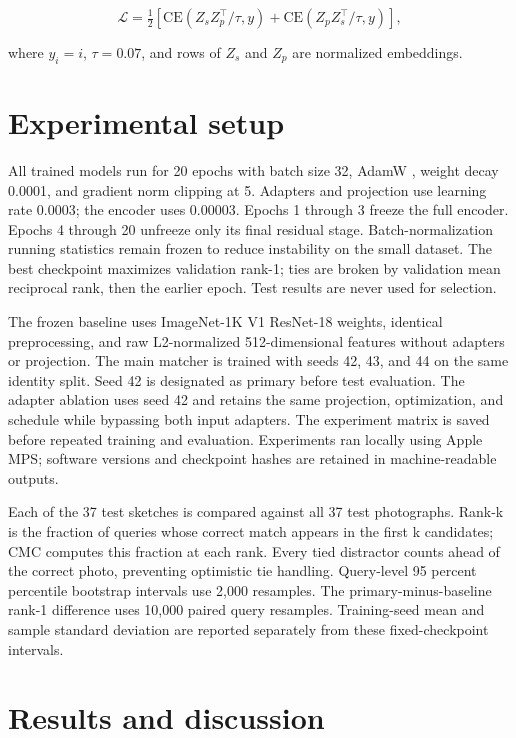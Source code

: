 \documentclass[cameraready]{ieeeconf}
\begin{document}
\begin{equation}

\mathcal{L}=\tfrac{1}{2}\left[\mathrm{CE}(Z_s Z_p^\top/\tau,y)+\mathrm{CE}(Z_p Z_s^\top/\tau,y)\right],

\end{equation}

where $y_i=i$, $\tau=0.07$, and rows of $Z_s$ and $Z_p$ are normalized embeddings.

\section{Experimental setup}

All trained models run for 20 epochs with batch size 32, AdamW \cite{ref5}, weight decay 0.0001, and gradient norm clipping at 5. Adapters and projection use learning rate 0.0003; the encoder uses 0.00003. Epochs 1 through 3 freeze the full encoder. Epochs 4 through 20 unfreeze only its final residual stage. Batch-normalization running statistics remain frozen to reduce instability on the small dataset. The best checkpoint maximizes validation rank-1; ties are broken by validation mean reciprocal rank, then the earlier epoch. Test results are never used for selection.


The frozen baseline uses ImageNet-1K V1 ResNet-18 weights, identical preprocessing, and raw L2-normalized 512-dimensional features without adapters or projection. The main matcher is trained with seeds 42, 43, and 44 on the same identity split. Seed 42 is designated as primary before test evaluation. The adapter ablation uses seed 42 and retains the same projection, optimization, and schedule while bypassing both input adapters. The experiment matrix is saved before repeated training and evaluation. Experiments ran locally using Apple MPS; software versions and checkpoint hashes are retained in machine-readable outputs.


Each of the 37 test sketches is compared against all 37 test photographs. Rank-k is the fraction of queries whose correct match appears in the first k candidates; CMC computes this fraction at each rank. Every tied distractor counts ahead of the correct photo, preventing optimistic tie handling. Query-level 95 percent percentile bootstrap intervals use 2,000 resamples. The primary-minus-baseline rank-1 difference uses 10,000 paired query resamples. Training-seed mean and sample standard deviation are reported separately from these fixed-checkpoint intervals.


\section{Results and discussion}
\end{document}
